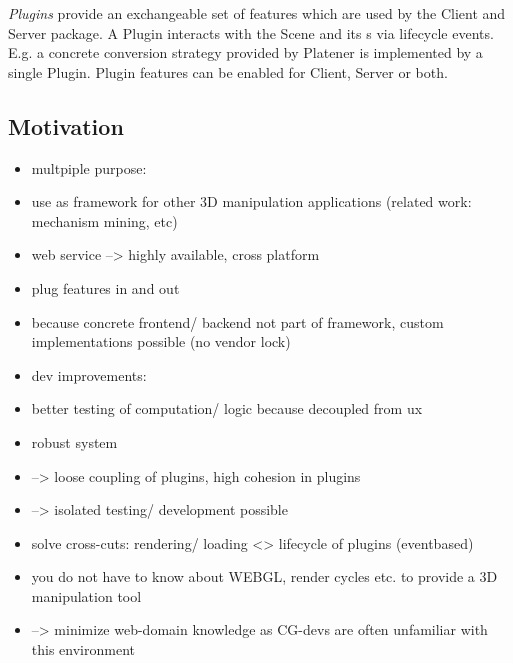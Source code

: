 \documentclass[../ClassicThesis.tex]{subfiles}
\begin{document}
\emph{Plugins} provide an exchangeable set of features which are used by the Client and Server package. A Plugin
interacts with the Scene and its {\threedmodel}s via lifecycle events. E.g. a concrete conversion strategy provided by
Platener is implemented by a single Plugin. Plugin features can be enabled for Client, Server or both.

\subsection{Motivation}
\begin{itemize}
\item multpiple purpose:
\item use as framework for other 3D manipulation applications (related work: mechanism mining, etc)
\item web service --> highly available, cross platform
\item plug features in and out
\item because concrete frontend/ backend not part of framework, custom implementations possible (no vendor lock)

\item dev improvements:
\item better testing of computation/ logic because decoupled from ux
\item robust system
\item --> loose coupling of plugins, high cohesion in plugins
\item --> isolated testing/ development possible
\item solve cross-cuts: rendering/ loading <> lifecycle of plugins (eventbased)
\item you do not have to know about WEBGL, render cycles etc. to provide a 3D manipulation tool
\item --> minimize web-domain knowledge as CG-devs are often unfamiliar with this environment
\end{itemize}
\end{document}
